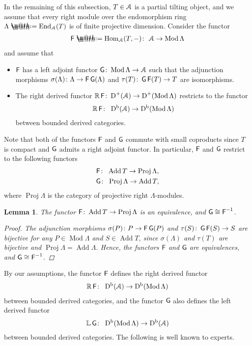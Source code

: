 \documentclass[pdftex]{sigma}%
\makeatletter
\newtheorem{lem}[dfn]{Lemma}
\newcommand*{\defeq}{\mathrel{\rlap{%
 \raisebox{0.3ex}{$\m@th\cdot$}}%
 \raisebox{-0.3ex}{$\m@th\cdot$}}%
 =}
\numberwithin{equation}{section}
\newcommand{\Hom}{\operatorname{Hom}}
\newcommand{\End}{\operatorname{End}}
\newcommand{\Mod}{\operatorname{Mod}}
\newcommand{\Proj}{\operatorname{Proj}}
\newcommand{\Add}{\operatorname{Add}}
\newcommand{\Db}{\operatorname{D^b}}
\newcommand{\D}{\operatorname{D}}
\newcommand{\bL}{\mathbb{L}}
\newcommand{\bR}{\mathbb{R}}
\newcommand{\scrA}{\EuScript{A}}
\newcommand{\F}{\operatorname{\sf{F}}}
\newcommand{\G}{\operatorname{\sf{G}}}
\makeatother
\begin{document}
In the remaining of this subsection, $T\in\scrA$ is a partial tilting object, and we assume that every right module over the endomorphism ring $\Lambda\defeq\End_{\scrA}(T)$ is of finite projective dimension. Consider the functor
 \begin{gather*}
{\F}\defeq\Hom_{\scrA}(T,-)\colon\ \scrA\to\Mod\Lambda
 \end{gather*}
and assume that
\begin{itemize}\itemsep=0pt
 \item[$(i)$] $\F$ has a left adjoint functor $\G\colon\Mod\Lambda\to \scrA$ such that the adjunction morphisms $\sigma({\Lambda})\colon \Lambda\to \F\G(\Lambda)$ and $\tau(T)\colon \G\F(T)\to T$ are isomorphisms.

 \item[$(ii)$] The right derived functor $\bR \F\colon \D^+(\scrA)\to \D^+(\Mod\Lambda)$ restricts to the functor
\begin{gather*}
 \bR \F\colon\ \Db(\scrA)\to \Db(\Mod\Lambda)
 \end{gather*}
 between bounded derived categories.
 \end{itemize}

 Note that both of the functors $\F$ and $\G$ commute with small coproducts since $T$ is compact and $\G$ admits a right adjoint functor. In particular, $\F$ and $\G$ restrict to the following functors
 \begin{gather*}
 \F\colon\ \Add T\to\Proj\Lambda,
 \\
\G\colon\ \Proj\Lambda\to \Add T,
 \end{gather*}
where $\Proj \Lambda$ is the category of projective right $\Lambda$-modules.
\begin{lem}\label{add proj}
The functor $\F\colon\Add T\to\Proj\Lambda$ is an equivalence, and $\G\cong \F^{-1}$.
\begin{proof}
The adjunction morphisms $\sigma({P})\colon P\to \F\G(P)$ and $\tau(S)\colon \G\F(S)\to S$ are bijective for any $P\in\Mod\Lambda$ and $S\in \Add T$, since $\sigma({\Lambda})$ and $\tau({T})$ are bijective and $\Proj \Lambda=\Add \Lambda$. Hence, the functors $\F$ and $\G$ are equivalences, and $\G\cong \F^{-1}$.
\end{proof}
\end{lem}

By our assumptions, the functor $\F$ defines the right derived functor
\begin{gather*}
\bR\F\colon\ \Db(\scrA)\to \Db(\Mod\Lambda)
\end{gather*}
between bounded derived categories, and the functor $\G$ also defines the left derived functor
\begin{gather*}
\bL\G\colon\ \Db(\Mod\Lambda)\to\Db(\scrA)
\end{gather*}
between bounded derived categories.
The following is well known to experts.
\end{document}
